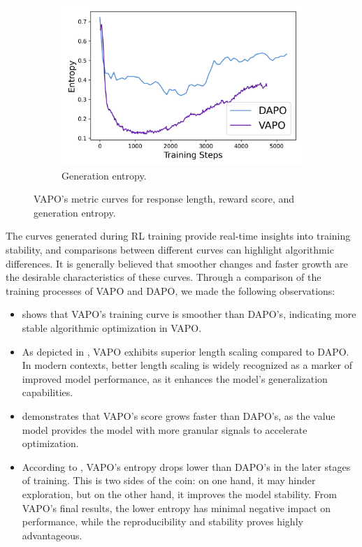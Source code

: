 \begin{figure}[t]
\begin{subfigure}{0.45\textwidth}
    \end{subfigure}
    \begin{subfigure}{0.45\textwidth}
        \centering
        \includegraphics[width=\textwidth]{fig/entropy.png}
        \caption{Generation entropy.}
        \label{subfig:entropy}
    \end{subfigure}
    \caption{VAPO's metric curves for response length, reward score, and generation entropy.}
    \label{fig:metrics}
\end{figure}

The curves generated during RL training provide real-time insights into training stability, and comparisons between different curves can highlight algorithmic differences. It is generally believed that smoother changes and faster growth are the desirable characteristics of these curves. Through a comparison of the training processes of VAPO and DAPO, we made the following observations:
\begin{itemize}
\item {} shows that VAPO's training curve is smoother than DAPO's, indicating more stable algorithmic optimization in VAPO.
\item As depicted in , VAPO exhibits superior length scaling compared to DAPO. In modern contexts, better length scaling is widely recognized as a marker of improved model performance, as it enhances the model's generalization capabilities.
\item {} demonstrates that VAPO's score grows faster than DAPO's, as the value model provides the model with more granular signals to accelerate optimization.
\item According to , VAPO's entropy drops lower than DAPO's in the later stages of training. This is two sides of the coin: on one hand, it may hinder exploration, but on the other hand, it improves the model stability. From VAPO's final results, the lower entropy has minimal negative impact on performance, while the reproducibility and stability proves highly advantageous.
\end{itemize}
